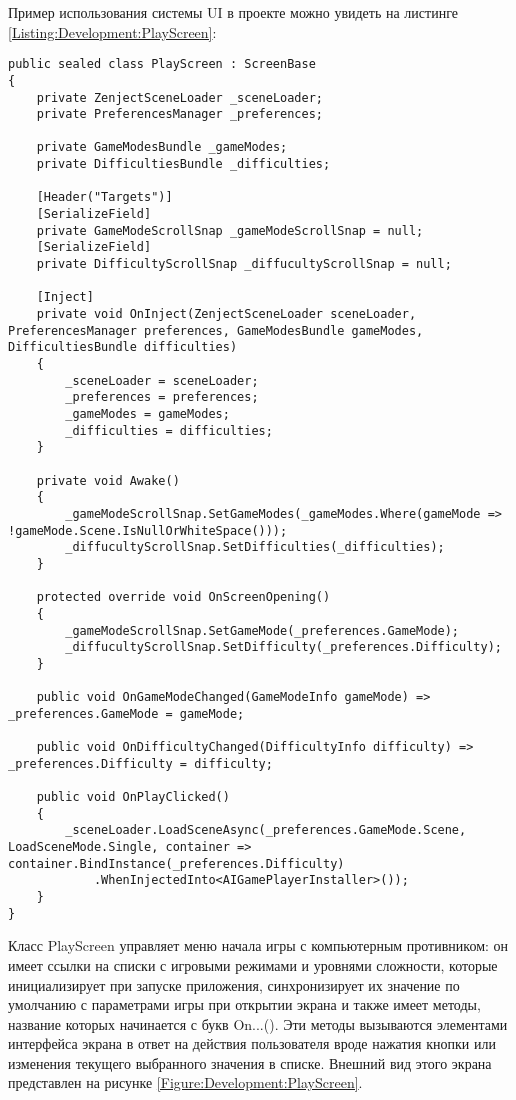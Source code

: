 Пример использования системы UI в проекте можно увидеть на листинге \ref{Listing:Development:PlayScreen}:

\begin{lstlisting}[caption={Класс экрана меню игры}, label=Listing:Development:PlayScreen]
public sealed class PlayScreen : ScreenBase
{
    private ZenjectSceneLoader _sceneLoader;
    private PreferencesManager _preferences;

    private GameModesBundle _gameModes;
    private DifficultiesBundle _difficulties;

    [Header("Targets")]
    [SerializeField]
    private GameModeScrollSnap _gameModeScrollSnap = null;
    [SerializeField]
    private DifficultyScrollSnap _diffucultyScrollSnap = null;

    [Inject]
    private void OnInject(ZenjectSceneLoader sceneLoader, PreferencesManager preferences, GameModesBundle gameModes, DifficultiesBundle difficulties)
    {
        _sceneLoader = sceneLoader;
        _preferences = preferences;
        _gameModes = gameModes;
        _difficulties = difficulties;
    }

    private void Awake()
    {
        _gameModeScrollSnap.SetGameModes(_gameModes.Where(gameMode => !gameMode.Scene.IsNullOrWhiteSpace()));
        _diffucultyScrollSnap.SetDifficulties(_difficulties);
    }

    protected override void OnScreenOpening()
    {
        _gameModeScrollSnap.SetGameMode(_preferences.GameMode);
        _diffucultyScrollSnap.SetDifficulty(_preferences.Difficulty);
    }

    public void OnGameModeChanged(GameModeInfo gameMode) => _preferences.GameMode = gameMode;

    public void OnDifficultyChanged(DifficultyInfo difficulty) => _preferences.Difficulty = difficulty;

    public void OnPlayClicked()
    {
        _sceneLoader.LoadSceneAsync(_preferences.GameMode.Scene, LoadSceneMode.Single, container => container.BindInstance(_preferences.Difficulty)
            .WhenInjectedInto<AIGamePlayerInstaller>());
    }
}
\end{lstlisting}

Класс PlayScreen управляет меню начала игры с компьютерным противником: он имеет ссылки на списки с игровыми режимами и уровнями сложности, которые инициализирует при запуске приложения, синхронизирует их значение по умолчанию с параметрами игры при открытии экрана и также имеет методы, название которых начинается с букв On...(). Эти методы вызываются элементами интерфейса экрана в ответ на действия пользователя вроде нажатия кнопки или изменения текущего выбранного значения в списке. Внешний вид этого экрана представлен на рисунке \ref{Figure:Development:PlayScreen}.

